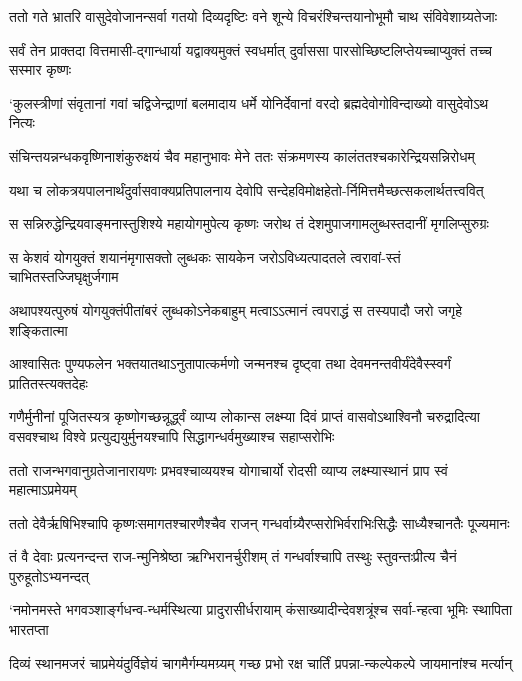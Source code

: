 \twolineshloka
{ततो गते भ्रातरि वासुदेवोजानन्सर्वा गतयो दिव्यदृष्टिः}
{वने शून्ये विचरंश्चिन्तयानोभूमौ चाथ संविवेशाग्र्यतेजाः}


\twolineshloka
{सर्वं तेन प्राक्तदा वित्तमासी-द्गान्धार्या यद्वाक्यमुक्तं स्वधर्मात्}
{दुर्वाससा पारसोच्छिष्टलिप्तेयच्चाप्युक्तं तच्च सस्मार कृष्णः}


\twolineshloka
{`कुलस्त्रीणां संवृतानां गवां चद्विजेन्द्राणां बलमादाय धर्मे}
{योनिर्देवानां वरदो ब्रह्मदेवोगोविन्दाख्यो वासुदेवोऽथ नित्यः}


\twolineshloka
{संचिन्तयन्नन्धकवृष्णिनाशंकुरुक्षयं चैव महानुभावः}
{मेने ततः संक्रमणस्य कालंततश्चकारेन्द्रियसन्निरोधम्}


\twolineshloka
{यथा च लोकत्रयपालनार्थंदुर्वासवाक्यप्रतिपालनाय}
{देवोपि सन्देहविमोक्षहेतो-र्निमित्तमैच्छत्सकलार्थतत्त्ववित्}


\twolineshloka
{स सन्निरुद्धेन्द्रियवाङ्मनास्तुशिश्ये महायोगमुपेत्य कृष्णः}
{जरोथ तं देशमुपाजगामलुब्धस्तदानीं मृगलिप्सुरुग्रः}


\twolineshloka
{स केशवं योगयुक्तं शयानंमृगासक्तो लुब्धकः सायकेन}
{जरोऽविध्यत्पादतले त्वरावां-स्तं चाभितस्तज्जिघृक्षुर्जगाम}


\twolineshloka
{अथापश्यत्पुरुषं योगयुक्तंपीतांबरं लुब्धकोऽनेकबाहुम्}
{मत्वाऽऽत्मानं त्वपराद्धं स तस्यपादौ जरो जगृहे शङ्कितात्मा}


\twolineshloka
{आश्वासितः पुण्यफलेन भक्तयातथाऽनुतापात्कर्मणो जन्मनश्च}
{दृष्ट्वा तथा देवमनन्तवीर्यंदेवैस्स्वर्गं प्रातितस्त्यक्तदेहः}


गणैर्मुनीनां पूजितस्यत्र कृष्णोगच्छन्नूर्द्ध्वं व्याप्य लोकान्स लक्ष्म्या
\twolineshloka
{दिवं प्राप्तं वासवोऽथाश्विनौ चरुद्रादित्या वसवश्चाथ विश्वे}
{प्रत्युद्ययुर्मुनयश्चापि सिद्धागन्धर्वमुख्याश्च सहाप्सरोभिः}


\twolineshloka
{ततो राजन्भगवानुग्रतेजानारायणः प्रभवश्चाव्ययश्च}
{योगाचार्यो रोदसी व्याप्य लक्ष्म्यास्थानं प्राप स्वं महात्माऽप्रमेयम्}


\twolineshloka
{ततो देवैर्ऋषिभिश्चापि कृष्णःसमागतश्चारणैश्चैव राजन्}
{गन्धर्वाग्र्यैरप्सरोभिर्वराभिःसिद्धैः साध्यैश्चानतैः पूज्यमानः}


\twolineshloka
{तं वै देवाः प्रत्यनन्दन्त राज-न्मुनिश्रेष्ठा ऋग्भिरानर्चुरीशम्}
{तं गन्धर्वाश्चापि तस्थुः स्तुवन्तःप्रीत्य चैनं पुरुहूतोऽभ्यनन्दत्}


\twolineshloka
{`नमोनमस्ते भगवञ्शार्ङ्गधन्व-न्धर्मस्थित्या प्रादुरासीर्धरायाम्}
{कंसाख्यादीन्देवशत्रूंश्च सर्वा-न्हत्वा भूमिः स्थापिता भारतप्ता}


\twolineshloka
{दिव्यं स्थानमजरं चाप्रमेयंदुर्विज्ञेयं चागमैर्गम्यमग्र्यम्}
{गच्छ प्रभो रक्ष चार्तिं प्रपन्ना-न्कल्पेकल्पे जायमानांश्च मर्त्यान्}


